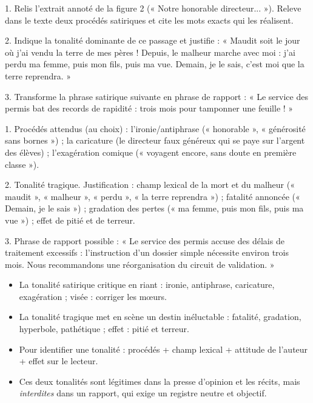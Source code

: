 \documentclass[11pt]{article}
\newcommand{\cle}[1]{{\popxbold\color{popdark}#1}}
\begin{document}
\begin{exercice}
1. Relis l'extrait annoté de la figure 2 (« Notre honorable directeur... »). Releve dans le texte deux procédés satiriques et cite les mots exacts qui les réalisent.

2. Indique la tonalité dominante de ce passage et justifie : « Maudit soit le jour où j'ai vendu la terre de mes pères ! Depuis, le malheur marche avec moi : j'ai perdu ma femme, puis mon fils, puis ma vue. Demain, je le sais, c'est moi que la terre reprendra. »

3. Transforme la phrase satirique suivante en phrase de rapport : « Le service des permis bat des records de rapidité : trois mois pour tamponner une feuille ! »
\end{exercice}

\begin{corrige}
1. Procédés attendus (au choix) : l'ironie/antiphrase (« honorable », « générosité sans bornes ») ; la caricature (le directeur faux généreux qui se paye sur l'argent des élèves) ; l'exagération comique (« voyagent encore, sans doute en première classe »).

2. Tonalité tragique. Justification : champ lexical de la mort et du malheur (« maudit », « malheur », « perdu », « la terre reprendra ») ; fatalité annoncée (« Demain, je le sais ») ; gradation des pertes (« ma femme, puis mon fils, puis ma vue ») ; effet de pitié et de terreur.

3. Phrase de rapport possible : « Le service des permis accuse des délais de traitement excessifs : l'instruction d'un dossier simple nécessite environ trois mois. Nous recommandons une réorganisation du circuit de validation. »
\end{corrige}

\begin{aretenir}[L'essentiel]
\begin{itemize}
\item La \cle{tonalité satirique} critique en riant : ironie, antiphrase, caricature, exagération ; visée : corriger les mœurs.
\item La \cle{tonalité tragique} met en scène un destin inéluctable : fatalité, gradation, hyperbole, pathétique ; effet : pitié et terreur.
\item Pour identifier une tonalité : procédés + champ lexical + attitude de l'auteur + effet sur le lecteur.
\item Ces deux tonalités sont légitimes dans la presse d'opinion et les récits, mais \emph{interdites} dans un rapport, qui exige un registre neutre et objectif.
\end{itemize}
\end{aretenir}
\end{document}
